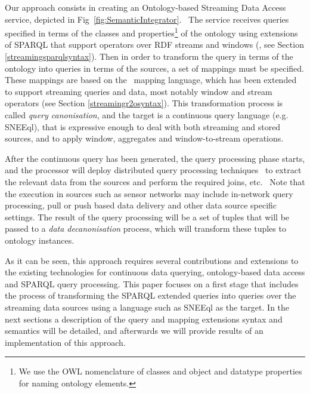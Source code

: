 Our approach consists in creating an Ontology-based Streaming Data Access service, depicted in Fig~\ref{fig:SemanticIntegrator}.\ %
The service receives queries specified in terms of the classes and properties\footnote{We use the OWL nomenclature of
classes and object and datatype properties for naming ontology elements.} of the ontology using extensions of SPARQL
that support operators over RDF streams and windows (\sparqlstr, see Section \ref{streamingsparqlsyntax}). Then in
order to transform the query in terms of the ontology into queries in terms of the sources, a set of mappings must be
specified. These mappings are based on the \rtwoo\ mapping language, which has been extended to support  streaming
queries and data, most notably window and stream operators (see Section \ref{streamingr2osyntax}). This transformation
process is called \textit{query canonisation}, and the target is a continuous query language (e.g. SNEEql), that is
expressive enough to deal with both streaming and stored sources, and to apply window, aggregates and window-to-stream
operations.

After the continuous query has been generated, the query processing phase starts, and the processor will deploy distributed query processing techniques~\cite{Kossmann_00} to extract the relevant data from the sources and perform the required joins, etc.\ %
%
Note that the execution in sources such as sensor networks may include in-network query processing, pull or push based data delivery and other data source specific settings. The result of the query processing will be a set of tuples that will be passed to a \textit{data decanonisation} process, which will transform these tuples to ontology instances.

As it can be seen, this approach requires several contributions and extensions to the existing technologies for continuous data querying, ontology-based data access and SPARQL query processing. This paper focuses on a first stage that includes the process of transforming the SPARQL extended queries into queries over the streaming data sources using a language such as SNEEql as the target. In the next sections a description of the query and mapping extensions syntax and semantics will be detailed, and afterwards we will provide results of an implementation of this approach.

